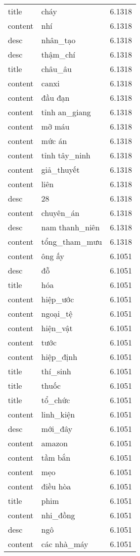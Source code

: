\documentclass{article}
\begin{document}
\begin{tabular}{lll}
title & cháy & 6.1318\\
content & nhí & 6.1318\\
desc & nhân\_tạo & 6.1318\\
desc & thậm\_chí & 6.1318\\
title & châu\_âu & 6.1318\\
content & canxi & 6.1318\\
content & đầu đạn & 6.1318\\
content & tỉnh an\_giang & 6.1318\\
content & mỡ máu & 6.1318\\
content & mức án & 6.1318\\
content & tỉnh tây\_ninh & 6.1318\\
content & giả\_thuyết & 6.1318\\
content & liên & 6.1318\\
desc & 28 & 6.1318\\
content & chuyên\_án & 6.1318\\
desc & nam thanh\_niên & 6.1318\\
content & tổng\_tham\_mưu & 6.1318\\
content & ông ấy & 6.1051\\
desc & đỗ & 6.1051\\
title & hóa & 6.1051\\
content & hiệp\_ước & 6.1051\\
content & ngoại\_tệ & 6.1051\\
content & hiện\_vật & 6.1051\\
content & tước & 6.1051\\
content & hiệp\_định & 6.1051\\
title & thí\_sinh & 6.1051\\
title & thuốc & 6.1051\\
title & tổ\_chức & 6.1051\\
content & linh\_kiện & 6.1051\\
desc & mới\_đây & 6.1051\\
content & amazon & 6.1051\\
content & tầm bắn & 6.1051\\
content & mẹo & 6.1051\\
content & điều hòa & 6.1051\\
title & phim & 6.1051\\
content & nhi\_đồng & 6.1051\\
desc & ngô & 6.1051\\
content & các nhà\_máy & 6.1051\\

\end{tabular}
\end{document}
